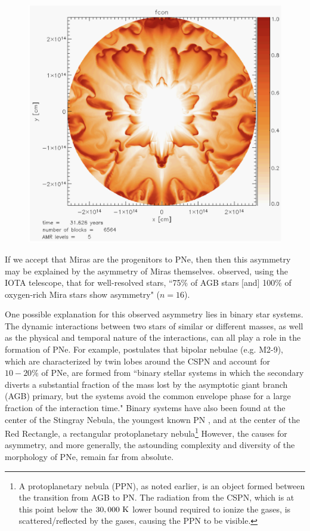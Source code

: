 \documentclass[twocolumn]{aastex63}
\begin{document}
\begin{figure}[ht]
    \includegraphics[width=\textwidth]{dust_condensation.png}
\end{figure}

If we accept that Miras are the progenitors to PNe, then then this asymmetry may be explained by the asymmetry of Miras themselves. \cite{ragland} observed, using the IOTA telescope, that for well-resolved stars, ``75\% of AGB stars [and] 100\% of oxygen-rich Mira stars show asymmetry" ($n=16$).

One possible explanation for this observed asymmetry lies in binary star systems. The dynamic interactions between two stars of similar or different masses, as well as the physical and temporal nature of the interactions, can all play a role in the formation of PNe. For example, \cite{soker1998} postulates that bipolar nebulae (e.g. M2-9), which are characterized by twin lobes around the CSPN and account for $10-20\%$ of PNe, are formed from ``binary stellar systems in which the secondary diverts a substantial fraction of the mass lost by the asymptotic giant branch (AGB) primary, but the systems avoid the common envelope phase for a large fraction of the interaction time." Binary systems have also been found at the center of the Stingray Nebula, the youngest known PN \citep{bobrowsky}, and at the center of the Red Rectangle, a rectangular protoplanetary nebula\footnote{A protoplanetary nebula (PPN), as noted earlier, is an object formed between the transition from AGB to PN. The radiation from the CSPN, which is at this point below the $30,000~{\rm K}$ lower bound required to ionize the gases, is scattered/reflected by the gases, causing the PPN to be visible.} \citep{cohen} However, the causes for asymmetry, and more generally, the astounding complexity and diversity of the morphology of PNe, remain far from absolute. 
\end{document}

